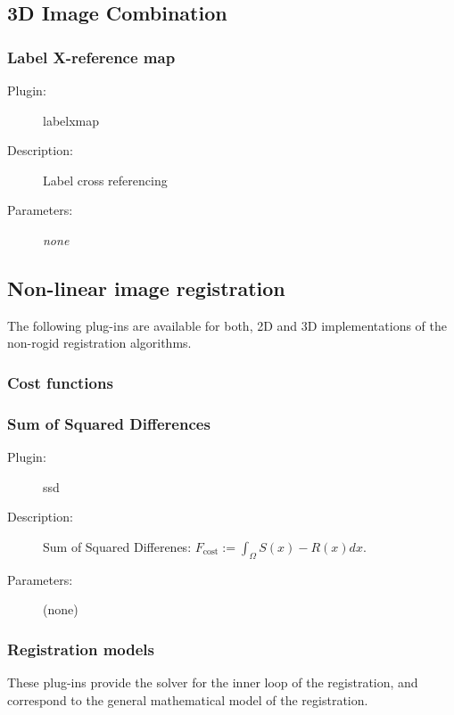\subsection{3D Image Combination}
\label{sec:3dcombiners}

\subsubsection*{Label X-reference map}

\begin{description}
\item [Plugin:] labelxmap
\item [Description:] Label cross referencing 
\item [Parameters:] \emph{none}
\end{description}


\subsection{Non-linear image registration}
\label{sec:nrreg}

The following plug-ins are available for both, 2D and 3D implementations of the non-rogid registration algorithms. 

\subsubsection{Cost functions}

\subsubsection*{Sum of Squared Differences}

\begin{description}
\item [Plugin:] ssd
\item [Description:] Sum of Squared Differenes: $F_\text{cost} := \int_\Omega S(x) - R(x) dx$. 
\item [Parameters:] (none)
\end{description}

\subsubsection{Registration models}

These plug-ins provide the solver for the inner loop of the registration, and correspond to the general mathematical model 
  of the registration.  

